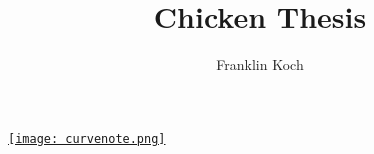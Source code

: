 \documentclass{article}
\title{Chicken Thesis}
\author{Franklin Koch}
\date{\displaydate{articleDate}}
\newcommand{\logo}{
  \href{https://curvenote.com}{\texttt{[image: curvenote.png]}}
}
\begin{document}
\maketitle
\begin{center}\logo\end{center}









\end{document}
